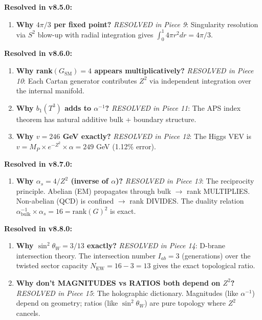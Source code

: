 \documentclass[12pt,a4paper]{article}
\newcommand{\sinW}{\sin^2\theta_W}
\newcommand{\Zsq}{Z^2}
\begin{document}
\begin{tcolorbox}[colback=yellow!10!white, colframe=orange!75!black, title=Derivation Gaps (v8.8.8 Update --- ALL CLOSED)]
\textbf{Resolved in v8.5.0:}
\begin{enumerate}[itemsep=0pt]
    \item[\checkmark] \textbf{Why $4\pi/3$ per fixed point?} \textit{RESOLVED in Piece 9}: Singularity resolution via $S^2$ blow-up with radial integration gives $\int_0^1 4\pi r^2 dr = 4\pi/3$.
\end{enumerate}

\textbf{Resolved in v8.6.0:}
\begin{enumerate}[itemsep=0pt]
    \item[\checkmark] \textbf{Why rank$(G_{\text{SM}}) = 4$ appears multiplicatively?} \textit{RESOLVED in Piece 10}: Each Cartan generator contributes $\Zsq$ via independent integration over the internal manifold.
    \item[\checkmark] \textbf{Why $b_1(T^3)$ adds to $\alpha^{-1}$?} \textit{RESOLVED in Piece 11}: The APS index theorem has natural additive bulk + boundary structure.
    \item[\checkmark] \textbf{Why $v = 246$ GeV exactly?} \textit{RESOLVED in Piece 12}: The Higgs VEV is $v = M_P \times e^{-\Zsq} \times \alpha = 249$ GeV (1.12\% error).
\end{enumerate}

\textbf{Resolved in v8.7.0:}
\begin{enumerate}[itemsep=0pt]
    \item[\checkmark] \textbf{Why $\alpha_s = 4/\Zsq$ (inverse of $\alpha$)?} \textit{RESOLVED in Piece 13}: The reciprocity principle. Abelian (EM) propagates through bulk $\to$ rank MULTIPLIES. Non-abelian (QCD) is confined $\to$ rank DIVIDES. The duality relation $\alpha^{-1}_{\text{bulk}} \times \alpha_s = 16 = \text{rank}(G)^2$ is exact.
\end{enumerate}

\textbf{Resolved in v8.8.0:}
\begin{enumerate}[itemsep=0pt]
    \item[\checkmark] \textbf{Why $\sinW = 3/13$ exactly?} \textit{RESOLVED in Piece 14}: D-brane intersection theory. The intersection number $I_{ab} = 3$ (generations) over the twisted sector capacity $N_{\text{EW}} = 16 - 3 = 13$ gives the exact topological ratio.
    \item[\checkmark] \textbf{Why don't MAGNITUDES vs RATIOS both depend on $\Zsq$?} \textit{RESOLVED in Piece 15}: The holographic dictionary. Magnitudes (like $\alpha^{-1}$) depend on geometry; ratios (like $\sinW$) are pure topology where $\Zsq$ cancels.
\end{enumerate}


\end{tcolorbox}
\end{document}
